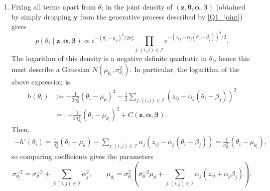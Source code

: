 \documentclass[12pt]{article}
\begin{document}
\begin{enumerate}[label=(\alph*)]
    This assumes that $(i, j) \in \mathscr{I}$, i.e.\ that $y_{ij}$ was observed.
    If not, $y_{ij}$ is not part of our model (does not appear in the joint
    distribution), so there is no question of a corresponding $z_{ij}$
    appearing anywhere.


    \item Fixing all terms apart from $\theta_i$ in the joint density of
    $(\bm{z}, \bm{\theta}, \bm{\alpha}, \bm{\beta})$ (obtained by simply
    dropping $\bm{y}$ from the generative process described by
    \eqref{Q1_joint}) gives \[
        p(\theta_i \mid \bm{z}, \bm{\alpha}, \bm{\beta})
            \propto e^{-(\theta_i - \mu_\theta)^2 /2\sigma_\theta^2}
                \prod_{j: (i, j) \in \mathscr{I}} e^{-(z_{ij} - \alpha_j(\theta_i - \beta_j))^2 / 2}.
    \] The logarithm of this density is a negative definite quadratic in
    $\theta_i$, hence this must describe a Gaussian $N(\mu_{\theta_i},
    \sigma_{\theta_i}^2)$.
    In particular, the logarithm of the above expression is \begin{align*}
        h(\theta_i)
            &:= -\frac{1}{2\sigma_\theta^2} (\theta_i - \mu_\theta)^2 -\frac{1}{2}\sum_{j: (i, j) \in \mathscr{I}} (z_{ij} - \alpha_j(\theta_i - \beta_j))^2 \\
            &=: -\frac{1}{2\sigma_{\theta_i}^2}(\theta_i - \mu_{\theta_i})^2 + C(\bm{z}, \bm{\alpha}, \bm{\beta}).
    \end{align*}
    Then, \begin{align*}
        -h'(\theta_i)
            = \frac{1}{\sigma_\theta^2} (\theta_i - \mu_\theta) -\sum_{j: (i, j) \in \mathscr{I}} \alpha_j (z_{ij} - \alpha_j(\theta_i - \beta_j))
            = \frac{1}{\sigma_{\theta_i}^2}(\theta_i - \mu_{\theta_i}),
    \end{align*}
    so comparing coefficients gives the parameters \[
        \sigma_{\theta_i}^{-2} = \sigma_{\theta}^{-2} + \sum_{j: (i, j) \in \mathscr{I}} \alpha_j^2, \qquad
        \mu_{\theta_i} = \sigma_{\theta_i}^2\left(\sigma_{\theta}^{-2}\mu_{\theta} + \sum_{j: (i, j) \in \mathscr{I}} \alpha_j(z_{ij} + \alpha_j\beta_j)\right).
    \]



\end{enumerate}
\end{document}
